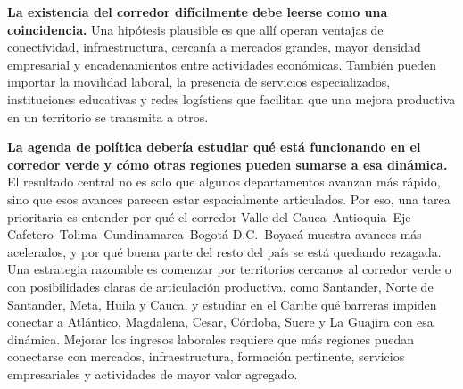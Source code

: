 \textbf{La existencia del corredor difícilmente debe leerse como una coincidencia.} Una hipótesis plausible es que allí operan ventajas de conectividad, infraestructura, cercanía a mercados grandes, mayor densidad empresarial y encadenamientos entre actividades económicas. También pueden importar la movilidad laboral, la presencia de servicios especializados, instituciones educativas y redes logísticas que facilitan que una mejora productiva en un territorio se transmita a otros.

\textbf{La agenda de política debería estudiar qué está funcionando en el corredor verde y cómo otras regiones pueden sumarse a esa dinámica.} El resultado central no es solo que algunos departamentos avanzan más rápido, sino que esos avances parecen estar espacialmente articulados. Por eso, una tarea prioritaria es entender por qué el corredor Valle del Cauca--Antioquia--Eje Cafetero--Tolima--Cundinamarca--Bogotá D.C.--Boyacá muestra avances más acelerados, y por qué buena parte del resto del país se está quedando rezagada. Una estrategia razonable es comenzar por territorios cercanos al corredor verde o con posibilidades claras de articulación productiva, como Santander, Norte de Santander, Meta, Huila y Cauca, y estudiar en el Caribe qué barreras impiden conectar a Atlántico, Magdalena, Cesar, Córdoba, Sucre y La Guajira con esa dinámica. Mejorar los ingresos laborales requiere que más regiones puedan conectarse con mercados, infraestructura, formación pertinente, servicios empresariales y actividades de mayor valor agregado.
